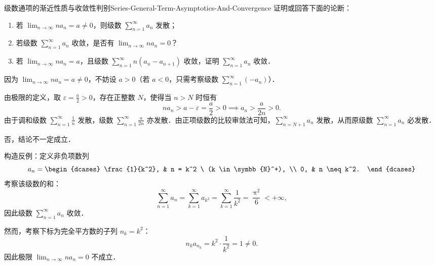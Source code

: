 \begin{problem}{级数通项的渐近性质与收敛性判别}{Series-General-Term-Asymptotics-And-Convergence}
    证明或回答下面的论断：
    \begin{enumerate}
        \item 若 $\lim_{n\to\infty} n a_n = a \neq 0$，则级数 $\sum_{n=1}^\infty a_n$ 发散；
        \item 若级数 $\sum_{n=1}^\infty a_n$ 收敛，是否有 $\lim_{n\to\infty} n a_n = 0$？
        \item 若 $\lim_{n\to\infty} n a_n = a$，且级数 $\sum_{n=1}^\infty n(a_n - a_{n+1})$ 收敛，证明 $\sum_{n=1}^\infty a_n$ 收敛．
    \end{enumerate}
\end{problem}

\begin{solution}

    因为 $\lim_{n\to\infty} n a_n = a \neq 0$，不妨设 $a > 0$（若 $a < 0$，只需考察级数 $\sum_{n=1}^\infty (-a_n)$）．

    由极限的定义，取 $\varepsilon = \frac{a}{2} > 0$，存在正整数 $N$，使得当 $n > N$ 时恒有
    \begin{equation}
        n a_n > a - \varepsilon = \frac{a}{2} > 0 \implies a_n > \frac{a}{2n} > 0.
    \end{equation}
    由于调和级数 $\sum_{n=1}^\infty \frac{1}{n}$ 发散，级数 $\sum_{n=1}^\infty \frac{a}{2n}$ 亦发散．由正项级数的比较审敛法可知，$\sum_{n=N+1}^\infty a_n$ 发散，从而原级数 $\sum_{n=1}^\infty a_n$ 必发散．

     否，结论不一定成立．

    构造反例：定义非负项数列
    \begin{equation}
        a_n = \begin{dcases}
            \frac{1}{k^2}, & n = k^2 \ (k \in \symbb{N}^+), \\
            0,             & n \neq k^2.
        \end{dcases}
    \end{equation}
    考察该级数的和：
    \begin{equation}
        \sum_{n=1}^\infty a_n = \sum_{k=1}^\infty a_{k^2} = \sum_{k=1}^\infty \frac{1}{k^2} = \frac{\uppi^2}{6} < +\infty,
    \end{equation}
    因此级数 $\sum_{n=1}^\infty a_n$ 收敛．

    然而，考察下标为完全平方数的子列 $n_k = k^2$：
    \begin{equation}
        n_k a_{n_k} = k^2 \cdot \frac{1}{k^2} = 1 \neq 0.
    \end{equation}
    因此极限 $\lim_{n\to\infty} n a_n = 0$ 不成立．


\end{solution}

